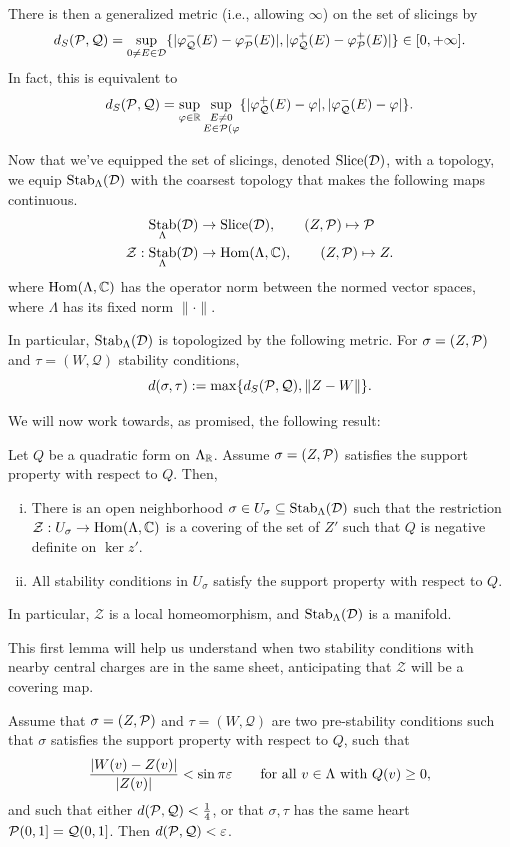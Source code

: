 \documentclass[12pt]{article}
\DeclareMathOperator{\Stab}{Stab}
\DeclareMathOperator{\Slice}{Slice}
\newcommand{\cQ}{\mathcal{Q}}
\newcommand{\cZ}{\mathcal{Z}}
\begin{document}
There is then a generalized metric (i.e., allowing $\infty$) on the set of slicings by
\[d_S(\cP,\cQ) = \sup_{0\neq E \in \cD} \{|\varphi_\cQ^-(E)-\varphi_\cP^-(E)|, |\varphi_\cQ^+(E)-\varphi_\cP^+(E)|\} \in [0,+\infty].\]
In fact, this is equivalent to
\[d_S(\cP,\cQ) = \sup_{\varphi\in \R}\sup_{\substack{E\neq 0\\ E\in \cP(\varphi}}\{|\varphi^+_\cQ(E) - \varphi|, |\varphi^-_\cQ(E) - \varphi|\}.\]

Now that we've equipped the set of slicings, denoted $\Slice(\cD)$, with a topology, we equip $\Stab_\Lambda(\cD)$ with the coarsest topology that makes the following maps continuous.
\begin{align*}
    \Stab_\Lambda(\cD) &\to \Slice(\cD), \qquad (Z,\cP) \mapsto \cP\\
    \cZ: \Stab_\Lambda(\cD) &\to \Hom(\Lambda,\C), \qquad (Z,\cP) \mapsto Z.
\end{align*}
where $\mathrm{Hom}(\Lambda,\mathbb{C})$ has the operator norm between the normed vector spaces, where $\Lambda$ has its fixed norm $\|\cdot\|$.

In particular, $\Stab_\Lambda(\cD)$ is topologized by the following metric. For $\sigma=(Z,\mathcal{P})$ and $\tau=(W,\cQ)$ stability conditions,
\[d(\sigma,\tau) \defeq \max\{d_S(\cP,\cQ), \|Z-W\|\}.\]


We will now work towards, as promised, the following result:

\begin{thm}
    Let $Q$ be a quadratic form on $\Lambda_{\mathbb{R}}$. Assume $\sigma = (Z,\mathcal{P})$ satisfies the support property with respect to $Q$. Then,
    \begin{enumerate}[(i)]
        \item There is an open neighborhood $\sigma \in U_\sigma \subseteq \Stab_\Lambda(\cD)$ such that the restriction $\cZ: U_\sigma \to \Hom(\Lambda, \C)$ is a covering of the set of $Z'$ such that $Q$ is negative definite on $\ker z'$.
        \item All stability conditions in $U_\sigma$ satisfy the support property with respect to $Q$.
    \end{enumerate}
    In particular, $\cZ$ is a local homeomorphism, and $\Stab_\Lambda(\cD)$ is a manifold.
\end{thm}

This first lemma will help us understand when two stability conditions with nearby central charges are in the same sheet, anticipating that $\cZ$ will be a covering map.

\begin{lem}
    Assume that $\sigma = (Z,\mathcal{P})$ and $\tau = (W,\cQ)$ are two pre-stability conditions such that $\sigma$ satisfies the support property with respect to $Q$, such that
    \[\frac{|W(v)-Z(v)|}{|Z(v)|}<\sin{\pi \varepsilon} \qquad \text{for all $v\in \Lambda$ with $Q(v)\geq 0$},\]
    and such that either $d(\cP,\cQ)<\frac{1}{4}$, or that $\sigma,\tau$ has the same heart $\cP(0,1]=\cQ(0,1]$. Then $d(\cP,\cQ)<\eps$.
\end{lem}
\end{document}
